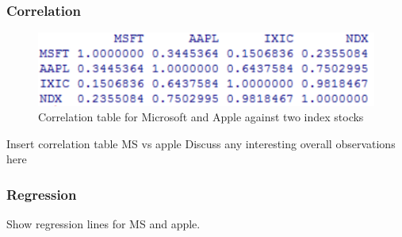 \documentclass[paper=a4, fontsize=11pt]{scrartcl} %
\numberwithin{equation}{section} %
\numberwithin{figure}{section} %
\numberwithin{table}{section} %
\begin{document}
\subsubsection{Correlation}

\begin{figure}[!htb]
  \includegraphics[width=\linewidth]{graph/cor1.png}
  \caption{Correlation table for Microsoft and Apple against two index stocks}
\endminipage\hfill
\end{figure}

Insert correlation table MS vs apple
Discuss any interesting overall observations here

\subsubsection{Regression}
Show regression lines for MS and apple. 
\end{document}
